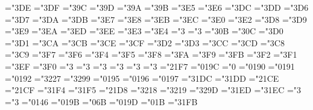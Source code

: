 \mathchardef\lvertneqq="3\thearfam DE
\mathchardef\gvertneqq="3\thearfam DF
\mathchardef\nleq="3\thearfam 9C
\mathchardef\ngeq="3\thearfam 9D
\mathchardef\nless="3\thearfam 9A
\mathchardef\ngtr="3\thearfam 9B
\mathchardef\nprec="3\thearfam E5
\mathchardef\nsucc="3\thearfam E6
\mathchardef\lneqq="3\thearfam DC
\mathchardef\gneqq="3\thearfam DD
\mathchardef\nleqslant="3\thearfam D6
\mathchardef\ngeqslant="3\thearfam D7
\mathchardef\lneq="3\thearfam DA
\mathchardef\gneq="3\thearfam DB
\mathchardef\npreceq="3\thearfam E7
\mathchardef\nsucceq="3\thearfam E8
\mathchardef\precnsim="3\thearfam EB
\mathchardef\succnsim="3\thearfam EC
\mathchardef\lnsim="3\thearfam E0
\mathchardef\gnsim="3\thearfam E2
\mathchardef\nleqq="3\thearfam D8
\mathchardef\ngeqq="3\thearfam D9
\mathchardef\precneqq="3\thearfam E9
\mathchardef\succneqq="3\thearfam EA
\mathchardef\precnapprox="3\thearfam ED
\mathchardef\succnapprox="3\thearfam EE
\mathchardef\lnapprox="3\thearfam E3
\mathchardef\gnapprox="3\thearfam E4
\mathchardef\nsim="3
\mathchardef\ncong="3
\mathchardef\diagup="3\thearfam 0B
\mathchardef\diagdown="3\thearfam 0C
\mathchardef\varsubsetneq="3\thearfam D0
\mathchardef\varsupsetneq="3\thearfam D1
\mathchardef\nsubseteqq="3\thearfam CA
\mathchardef\nsupseteqq="3\thearfam CB
\mathchardef\subsetneqq="3\thearfam CE
\mathchardef\supsetneqq="3\thearfam CF
\mathchardef\varsubsetneqq="3\thearfam D2
\mathchardef\varsupsetneqq="3\thearfam D3
\mathchardef\subsetneq="3\thearfam CC
\mathchardef\supsetneq="3\thearfam CD
\mathchardef\nsubseteq="3\thearfam C8
\mathchardef\nsupseteq="3\thearfam C9
\mathchardef\nparallel="3\thearfam F7
\mathchardef\nmid="3\thearfam F6
\mathchardef\nshortmid="3\thearfam F4
\mathchardef\nshortparallel="3\thearfam F5
\mathchardef\nvdash="3\thearfam F8
\mathchardef\nVdash="3\thearfam FA
\mathchardef\nvDash="3\thearfam F9
\mathchardef\nVDash="3\thearfam FB
\mathchardef\ntrianglerighteq="3\thearfam F2
\mathchardef\ntrianglelefteq="3\thearfam F1
\mathchardef\ntriangleleft="3\thearfam EF
\mathchardef\ntriangleright="3\thearfam F0
\mathchardef\nleftarrow="3
\mathchardef\nrightarrow="3
\mathchardef\nLeftarrow="3
\mathchardef\nRightarrow="3
\mathchardef\nLeftrightarrow="3
\mathchardef\nleftrightarrow="3
\mathchardef\divideontimes="21F7
\mathchardef\varnothing="019C
\mathchardef\nexists="0
\mathchardef\Finv="0190
\mathchardef\Game="0191
\mathchardef\mho="0192
\mathchardef\simeq="3227	%
\mathchardef\eqsim="3299
\mathchardef\beth="0195
\mathchardef\gimel="0196
\mathchardef\daleth="0197
\mathchardef\lessdot="31DC
\mathchardef\gtrdot="31DD
\mathchardef\ltimes="21CE
\mathchardef\rtimes="21CF
\mathchardef\shortmid="31F4
\mathchardef\shortparallel="31F5
\mathchardef\smallsetminus="21D8 %
\mathchardef\thicksim="3218 %
\mathchardef\thickapprox="3219 %
\mathchardef\approxeq="329D
\mathchardef\succapprox="31ED
\mathchardef\precapprox="31EC
\mathchardef\curvearrowleft="3
\mathchardef\curvearrowright="3
\mathchardef\digamma="0146 %
\mathchardef\varkappa="019B
\mathchardef\Bbbk="0\thearfam 6B
\mathchardef\hslash="019D
\mathchardef\hbar="0\thearfam 1B
\mathchardef\backepsilon="31FB %

